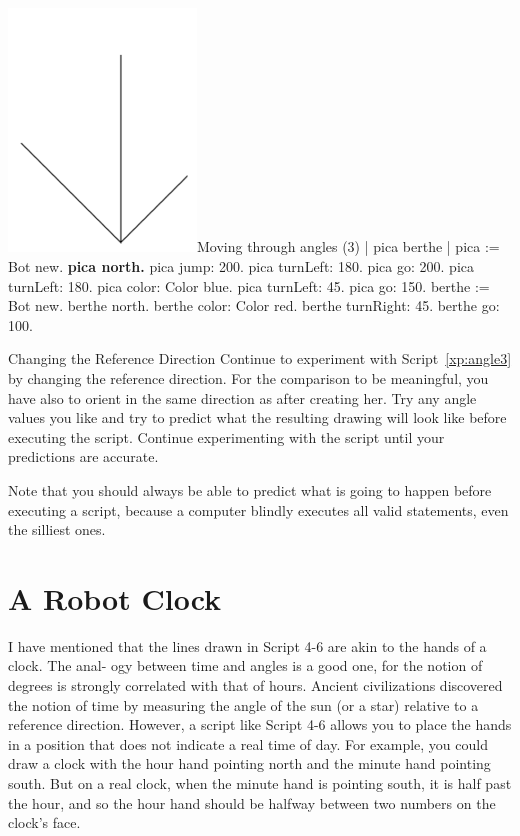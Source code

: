 \documentclass[a4paper,10pt,twoside]{book}
\begin{document}
\begin{scriptfigwithsize}[0.4]{\includegraphics[width=5cm]{threeAngles}}{Moving through angles (3)}\label{xp:angle3}
	| pica berthe | 
	pica := Bot new. 
	\textbf{pica north.}
	pica jump: 200. 
	pica turnLeft: 180. 
	pica go: 200. 
	pica turnLeft: 180. 
	pica color: Color blue. 
	pica turnLeft: 45. 
	pica go: 150. 
	berthe := Bot new. 
	berthe north. 
	berthe color: Color red. 
	berthe turnRight: 45. 
	berthe go: 100. 
\end{scriptfigwithsize}


\begin{exonofigtitle}{Changing the Reference Direction}
Continue to experiment with Script~\ref{xp:angle3} by changing the reference direction. For the comparison to be meaningful, 
you have also to orient  in the same direction as  after creating her. Try any angle values you like and 
try to predict what the resulting drawing will look like before executing the script. Continue experimenting with the 
script until your predictions are accurate. 
\end{exonofigtitle}

Note that you should always be able to predict what is going to happen before executing a 
script, because a computer blindly executes all valid statements, even the silliest ones. 

\section{A Robot Clock}

I have mentioned that the lines drawn in Script 4-6 are akin to the hands of a clock. The anal- 
ogy between time and angles is a good one, for the notion of degrees is strongly correlated 
with that of hours. Ancient civilizations discovered the notion of time by measuring the angle 
of the sun (or a star) relative to a reference direction. However, a script like Script 4-6 allows 
you to place the hands in a position that does not indicate a real time of day. For example, you 
could draw a clock with the hour hand pointing north and the minute hand pointing south. 
But on a real clock, when the minute hand is pointing south, it is half past the hour, and so 
the hour hand should be halfway between two numbers on the clock’s face. 
\end{document}
